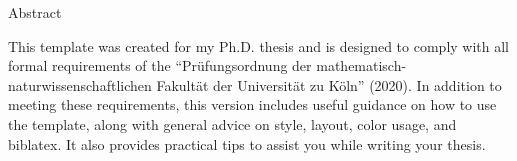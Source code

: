 \cleardoublepage
\thispagestyle{empty}

\begin{center}
{\color{maincolor2} \mainregular \Huge Abstract} 
\end{center}
\vspace{1cm}

This template was created for my Ph.D. thesis and is designed to comply with all formal requirements of the ``Prüfungsordnung der mathematisch-naturwissenschaftlichen Fakultät der Universität zu Köln'' (2020). In addition to meeting these requirements, this version includes useful guidance on how to use the template, along with general advice on style, layout, color usage, and biblatex. It also provides practical tips to assist you while writing your thesis.




